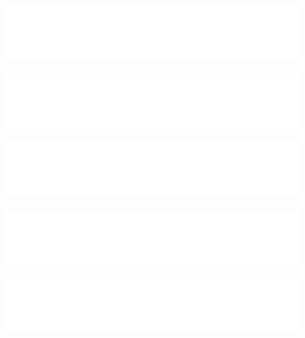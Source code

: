 \begin{titlepage}
\begin{figure}
            \end{figure}
        \fi
    \else
        \ifestg
            \begin{figure}
                \includegraphics[width=0.485\linewidth]{Figures/Theme/Logotypes/IPLeiria-ESTG-Logo-W.pdf}
            \end{figure}
        \fi
        \ifesad
            \begin{figure}
                \includegraphics[width=0.485\linewidth]{Figures/Theme/Logotypes/IPLeiria-ESAD-Logo-W.pdf}
            \end{figure}
        \fi
        \ifesslei
            \begin{figure}
                \includegraphics[width=0.485\linewidth]{Figures/Theme/Logotypes/IPLeiria-ESSLEI-Logo-W.pdf}
            \end{figure}
        \fi
        \ifestm
            \begin{figure}
                \includegraphics[width=0.485\linewidth]{Figures/Theme/Logotypes/IPLeiria-ESTM-Logo-W.pdf}
            \end{figure}
        \fi
        \ifesecs
            \begin{figure}
                \includegraphics[width=0.485\linewidth]{Figures/Theme/Logotypes/IPLeiria-ESECS-Logo-W.pdf}
            \end{figure}
        \fi
    \fi

    \vspace{5.5\baselineskip}

	\noindent


\end{titlepage}
